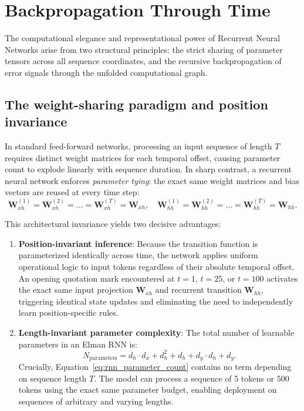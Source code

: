 \documentclass[../../main.tex]{subfiles}
\begin{document}
\clearpage
\section{Backpropagation Through Time}
\label{sec:rnn_weight_sharing_bptt}

The computational elegance and representational power of Recurrent Neural Networks arise from two structural principles: the strict sharing of parameter tensors across all sequence coordinates, and the recursive backpropagation of error signals through the unfolded computational graph.

\subsection{The weight-sharing paradigm and position invariance}
\label{subsec:rnn_weight_sharing}

In standard feed-forward networks, processing an input sequence of length $T$ requires distinct weight matrices for each temporal offset, causing parameter count to explode linearly with sequence duration. In sharp contrast, a recurrent neural network enforces \textit{parameter tying}: the exact same weight matrices and bias vectors are reused at every time step:
\begin{equation}
\mathbf{W}_{xh}^{(1)} = \mathbf{W}_{xh}^{(2)} = \dots = \mathbf{W}_{xh}^{(T)} = \mathbf{W}_{xh}, \quad \mathbf{W}_{hh}^{(1)} = \mathbf{W}_{hh}^{(2)} = \dots = \mathbf{W}_{hh}^{(T)} = \mathbf{W}_{hh}.
\end{equation}

This architectural invariance yields two decisive advantages:
\begin{enumerate}
    \item \textbf{Position-invariant inference}: Because the transition function is parameterized identically across time, the network applies uniform operational logic to input tokens regardless of their absolute temporal offset. An opening quotation mark encountered at $t=1$, $t=25$, or $t=100$ activates the exact same input projection $\mathbf{W}_{xh}$ and recurrent transition $\mathbf{W}_{hh}$, triggering identical state updates and eliminating the need to independently learn position-specific rules.
    \item \textbf{Length-invariant parameter complexity}: The total number of learnable parameters in an Elman RNN is:
    \begin{equation}
    N_{\text{parameters}} = d_h \cdot d_x + d_h^2 + d_h + d_y \cdot d_h + d_y.
    \label{eq:rnn_parameter_count}
    \end{equation}
    Crucially, Equation~\ref{eq:rnn_parameter_count} contains no term depending on sequence length $T$. The model can process a sequence of 5 tokens or 500 tokens using the exact same parameter budget, enabling deployment on sequences of arbitrary and varying lengths.
\end{enumerate}
\end{document}
